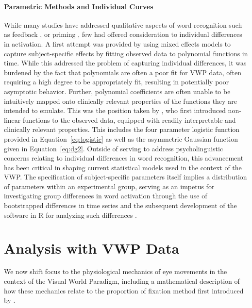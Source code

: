 \paragraph{Parametric Methods and Individual Curves} While many studies have addressed qualitative aspects of word recognition such as feedback \citep{Magnuson2003}, or priming \citep{luce1998delayed}, few had offered consideration to individual differences in activation. A first attempt was provided by \citet{Mirman2008} using mixed effects models to capture subject-specific effects by fitting observed data to polynomial functions in time. While this addressed the problem of capturing individual differences, it was burdened by the fact that polynomials are often a poor fit for VWP data, often requiring a high degree to be appropriately fit, resulting in potentially poor asymptotic behavior. Further, polynomial coefficients are often unable to be intuitively mapped onto clinically relevant properties of the functions they are intended to emulate. This was the position taken by \citet{mcmurray2010individual}, who first introduced non-linear functions to the observed data, equipped with readily interpretable and clinically relevant properties. This includes the four parameter logistic function provided in Equation~\ref{eq:logistic} as well as the asymmetric Gaussian function given in Equation~\ref{eq:dg2}. Outside of serving to address psycholinguistic concerns relating to individual differences in word recognition, this advancement has been critical in shaping current statistical models used in the context of the VWP. The specification of subject-specific parameters itself implies a distribution of parameters within an experimental group, serving as an impetus for investigating group differences in word activation through the use of bootstrapped differences in time series \citep{oleson2017detecting} and the subsequent development of the  software in R for analyzing such differences \citep{seedorff2018bdots}.



\section{Analysis with VWP Data}

We now shift focus to the physiological mechanics of eye movements in the context of the Visual World Paradigm, including a mathematical description of how these mechanics relate to the proportion of fixation method first introduced by \citet{allopenna1998tracking}.  




